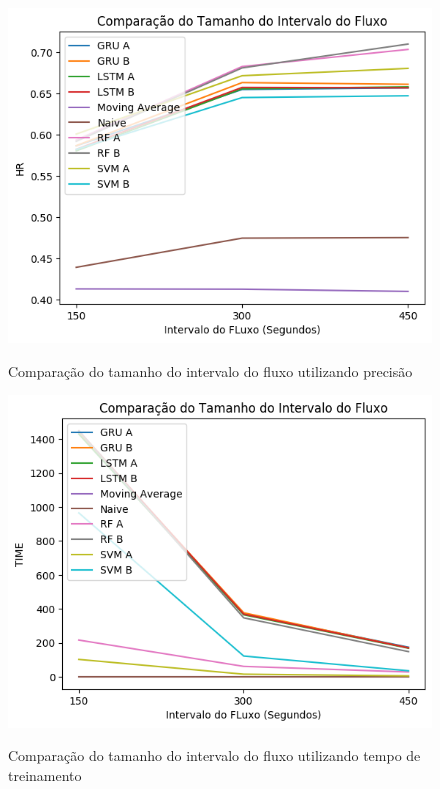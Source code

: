 \begin{figure}[htbp]
    \centering
    \includegraphics[scale=0.8]{monography/img/comparisons/comparacao_do_tamanho_do_intervalo_do_fluxo_hr.png}
    \label{figure:tamanho_do_intervalo_do_fluxo_hr}
    \caption{Comparação do tamanho do intervalo do fluxo utilizando precisão}
\end{figure}

\begin{figure}[htbp]
    \centering
    \includegraphics[scale=0.8]{monography/img/comparisons/comparacao_do_tamanho_do_intervalo_do_fluxo_time.png}
    \label{figure:tamanho_do_intervalo_do_fluxo_time}
    \caption{Comparação do tamanho do intervalo do fluxo utilizando tempo de treinamento}
\end{figure}